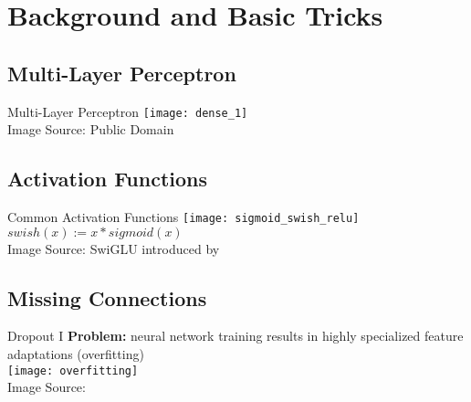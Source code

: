 \section{Background and Basic Tricks}
\subsection{Multi-Layer Perceptron}
\begin{frame}[c]{Multi-Layer Perceptron}
    \texttt{[image: dense\_1]} \\
    \normalsize
    Image Source: Public Domain
\end{frame}

\subsection{Activation Functions}
\begin{frame}[c]{Common Activation Functions}
    \texttt{[image: sigmoid\_swish\_relu]} \\
    $swish(x) := x * sigmoid(x)$ \\
    Image Source: \cite{chen_deep_2021} \hspace{1cm}
    SwiGLU introduced by \cite{shazeer_glu_2020}
\end{frame}

\subsection{Missing Connections}
\begin{frame}[c]{Dropout I}
    \large
    \textbf{Problem:} neural network training results in highly specialized feature adaptations (overfitting) \\
    \texttt{[image: overfitting]} \\
    \normalsize
    Image Source: \cite{lever_points_2016}
\end{frame}

